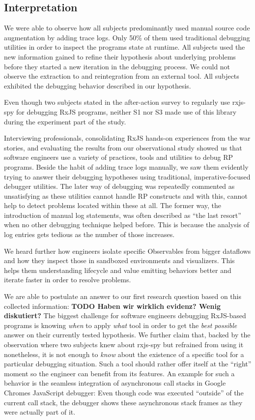 \documentclass[12pt,a4paper]{article}
\begin{document}
\subsection{Interpretation}

We were able to observe how all subjects predominantly used manual source code augmentation by adding trace logs. Only 50\% of them used traditional debugging utilities in order to inspect the programs state at runtime. All subjects used the new information gained to refine their hypothesis about underlying problems before they started a new iteration in the debugging process. We could not observe the extraction to and reintegration from an external tool. All subjects exhibited the debugging behavior described in our hypothesis.

Even though two subjects stated in the after-action survey to regularly use rxjs-spy for debugging RxJS programs, neither S1 nor S3 made use of this library during the experiment part of the study.

Interviewing professionals, consolidating RxJS hands-on experiences from the war stories, and evaluating the results from our observational study showed us that software engineers use a variety of practices, tools and utilities to debug RP programs. Beside the habit of adding trace logs manually, we saw them evidently trying to answer their debugging hypotheses using traditional, imperative-focused debugger utilities. The later way of debugging was repeatedly commented as unsatisfying as these utilities cannot handle RP constructs and with this, cannot help to detect problems located within these at all. The former way, the introduction of manual log statements, was often described as ``the last resort'' when no other debugging technique helped before. This is because the analysis of log entries gets tedious as the number of those increases.

We heard further how engineers isolate specific Observables from bigger dataflows and how they inspect those in sandboxed environments and visualizers. This helps them understanding lifecycle and value emitting behaviors better and iterate faster in order to resolve problems.

We are able to postulate an answer to our first research question based on this collected information: \textbf{TODO Haben wir wirklich evidenz? Wenig diskutiert?} The biggest challenge for software engineers debugging RxJS-based programs is knowing \emph{when} to apply \emph{what} tool in order to get the \emph{best possible} answer on their currently tested hypothesis. We further claim that, backed by the observation where two subjects knew about rxjs-spy but refrained from using it nonetheless, it is not enough to \emph{know} about the existence of a specific tool for a particular debugging situation. Such a tool should rather offer itself at the ``right'' moment so the engineer can benefit from its features. An example for such a behavior is the seamless integration of asynchronous call stacks in Google Chromes JavaScript debugger\cite{chromeasync}: Even though code was executed ``outside'' of the current call stack, the debugger shows these asynchronous stack frames as they were actually part of it.
\end{document}
